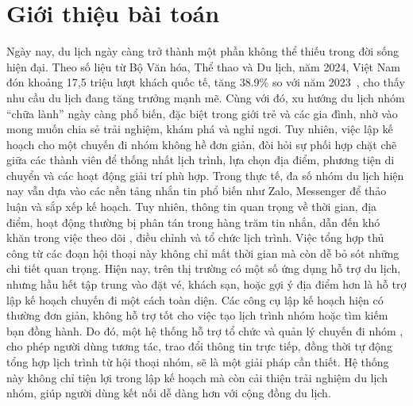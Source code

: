 \section{Giới thiệu bài toán}

Ngày nay, du lịch ngày càng trở thành một phần không thể thiếu trong đời sống hiện đại.
Theo số liệu từ Bộ Văn hóa, Thể thao và Du lịch, năm 2024, Việt Nam đón khoảng 17,5 triệu lượt khách quốc tế, tăng 38.9\% so với năm 2023~\cite{bvhttdl2024}, cho thấy nhu cầu du lịch đang tăng
trưởng mạnh mẽ. Cùng với đó, xu hướng du lịch nhóm ``chữa lành'' ngày càng phổ biến, đặc biệt trong giới trẻ và các gia đình, nhờ vào mong muốn chia sẻ trải nghiệm, khám phá và nghỉ ngơi.\nl
\indent Tuy nhiên, việc lập kế hoạch cho một chuyến đi nhóm không hề đơn giản, đòi hỏi sự phối hợp chặt chẽ giữa các thành viên để thống nhất lịch trình, lựa chọn địa điểm, 
phương tiện di chuyển và các hoạt động giải trí phù hợp. 
Trong thực tế, đa số nhóm du lịch hiện nay vẫn 
dựa vào các nền tảng nhắn tin phổ biến như Zalo, Messenger 
để thảo luận và sắp xếp kế hoạch. Tuy nhiên, 
thông tin quan trọng về thời gian, địa điểm, hoạt động thường bị phân tán trong 
hàng trăm tin nhắn, dẫn đến khó khăn trong việc theo dõi
, điều chỉnh và tổ chức lịch trình. Việc tổng hợp thủ công từ
 các đoạn hội thoại này không chỉ mất thời gian mà còn
  dễ bỏ sót những chi tiết quan trọng. \nl
\indent Hiện nay, trên thị trường có một số ứng dụng hỗ trợ du lịch, nhưng hầu hết tập trung vào đặt vé, khách sạn, hoặc gợi ý địa điểm hơn là hỗ trợ lập kế hoạch chuyến đi một cách toàn diện. Các công cụ lập kế hoạch hiện có thường đơn giản, không hỗ trợ tốt cho việc tạo lịch trình nhóm hoặc tìm kiếm bạn đồng hành. Do đó, một hệ thống hỗ trợ tổ chức và quản lý chuyến đi nhóm
, cho phép người dùng tương tác, trao đổi thông tin trực tiếp, 
đồng thời tự động tổng hợp lịch trình từ hội thoại nhóm,
 sẽ là một giải pháp cần thiết. Hệ thống này không chỉ tiện lợi trong lập kế hoạch mà còn 
 cải thiện trải nghiệm du lịch nhóm, 
 giúp người dùng kết nối dễ dàng hơn với cộng đồng du lịch.\nl
